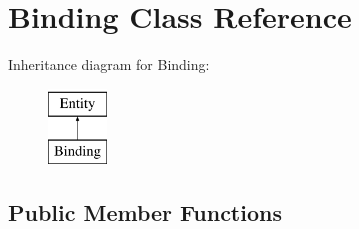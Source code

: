 \hypertarget{classBinding}{
\section{Binding Class Reference}
\label{classBinding}
}
Inheritance diagram for Binding:\begin{figure}[H]
\begin{center}
\leavevmode
\includegraphics[height=2.000000cm]{classBinding}
\end{center}
\end{figure}
\subsection*{Public Member Functions}

